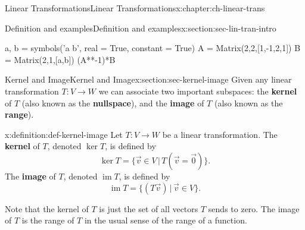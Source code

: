 \documentclass[oneside,10pt,]{book}
\newcommand{\terminology}[1]{\textbf{#1}}
\numberwithin{equation}{section}
\newcommand{\Img}{\operatorname{im}}
\begin{document}
\begin{chapterptx}{Linear Transformations}{}{Linear Transformations}{}{}{x:chapter:ch-linear-trans}
\begin{sectionptx}{Definition and examples}{}{Definition and examples}{}{}{x:section:sec-lin-tran-intro}
\begin{sageinput}
a, b = symbols('a b', real = True, constant = True)
A = Matrix(2,2,[1,-1,2,1])
B = Matrix(2,1,[a,b])
(A**-1)*B
\end{sageinput}
\end{sectionptx}
%
%
\typeout{************************************************}
\typeout{************************************************}
%
\begin{sectionptx}{Kernel and Image}{}{Kernel and Image}{}{}{x:section:sec-kernel-image}
Given any linear transformation \(T:V\to W\) we can associate two important subspaces: the \terminology{kernel} of \(T\) (also known as the \terminology{nullspace}), and the \terminology{image} of \(T\) (also known as the \terminology{range}).%
\begin{definition}{}{x:definition:def-kernel-image}%
Let \(T:V\to W\) be a linear transformation. The \terminology{kernel} of \(T\), denoted \(\ker T\), is defined by%
\begin{equation*}
\ker T = \{\vec{v}\in V \,|\, T(\vec{v}=\vec{0})\}\text{.}
\end{equation*}
The \terminology{image} of \(T\), denoted \(\Img T\), is defined by%
\begin{equation*}
\Img T = \{(T\vec{v}) \,|\, \vec{v}\in V\}\text{.}
\end{equation*}
%
\end{definition}
Note that the kernel of \(T\) is just the set of all vectors \(T\) sends to zero. The image of \(T\) is the range of \(T\) in the usual sense of the range of a function.%
\end{sectionptx}
\end{chapterptx}
\end{document}
